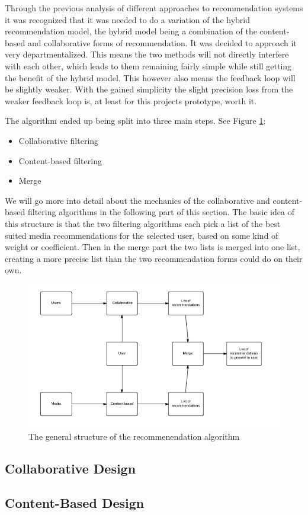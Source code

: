 Through the previous analysis of different approaches to recommendation systems it was recognized that it was needed to do a variation of the hybrid recommendation model, the hybrid model being a combination of the content-based and collaborative forms of recommendation. It was decided to approach it very departmentalized. This means the two methods will not directly interfere with each other, which leads to them remaining fairly simple while still getting the benefit of the hybrid model. This however also means the feedback loop will be slightly weaker. With the gained simplicity the slight precision loss from the weaker feedback loop is, at least for this projects prototype, worth it.

The algorithm ended up being split into three main steps. See Figure \ref{GenRecAlgo}:
\begin{itemize}
	\item Collaborative filtering
	\item Content-based filtering
	\item Merge
\end{itemize}

We will go more into detail about the mechanics of the collaborative and content-based filtering algorithms in the following part of this section. The basic idea of this structure is that the two filtering algorithms each pick a list of the best suited media recommendations for the selected user, based on some kind of weight or coefficient. Then in the merge part the two lists is merged into one list, creating a more precise list than the two recommendation forms could do on their own.

\begin{figure}[htb]
\centering
\includegraphics[width=1\textwidth]{Images/RecommendationAlgo.png}
\caption{The general structure of the recommenendation algorithm}
\label{GenRecAlgo}
\end{figure}

\subsection{Collaborative Design}
\label{CollaborativeDes}

\subsection{Content-Based Design}
\label{ContentBasedDes}
